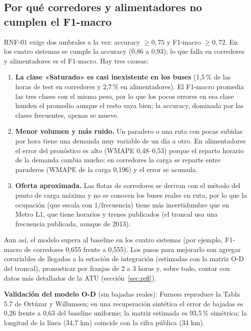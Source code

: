 \documentclass[11pt]{article}
\begin{document}
\subsection{Por qué corredores y alimentadores no cumplen el F1-macro}
\label{sec:f1}
RNF-01 exige dos umbrales a la vez: accuracy $\ge 0{,}75$ y F1-macro $\ge 0{,}72$. En los cuatro sistemas se
cumple la accuracy (0,86 a 0,93); lo que falla en corredores y alimentadores es el F1-macro. Hay tres causas:
\begin{enumerate}
  \item \textbf{La clase «Saturado» es casi inexistente en los buses} (1,5\,\% de las horas de test en corredores y
        2,7\,\% en alimentadores). El F1-macro promedia las tres clases con el mismo peso, por lo que los pocos
        errores en esa clase hunden el promedio aunque el resto vaya bien; la accuracy, dominada por las
        clases frecuentes, apenas se mueve.
  \item \textbf{Menor volumen y más ruido.} Un paradero o una ruta con pocas subidas por hora tiene una demanda
        muy variable de un día a otro. En alimentadores el error del pronóstico es alto (WMAPE 0,48--0,53) porque
        el reparto horario de la demanda cambia mucho; en corredores la carga se reparte entre paraderos
        (WMAPE de la carga 0,196) y el error se acumula.
  \item \textbf{Oferta aproximada.} Las flotas de corredores se derivan con el método del punto de carga máxima y no se
        conocen los buses reales en ruta, por lo que la ocupación (que escala con $1/\text{frecuencia}$) tiene más
        incertidumbre que en Metro L1, que tiene horarios y trenes publicados (el troncal usa una frecuencia publicada, aunque de 2013).
\end{enumerate}
Aun así, el modelo supera al baseline en los cuatro sistemas (por ejemplo, F1-macro de corredores 0,655 frente a
0,555). Los pasos para mejorarlo son agregar covariables de llegadas a la estación de integración (estimadas con
la matriz O-D del troncal), pronosticar por franjas de 2 a 3 horas y, sobre todo, contar con datos más
detallados de la ATU (sección~\ref{sec:refl}).

\textbf{Validación del modelo O-D} (sin bajadas reales): Furness reproduce la Tabla 5.7 de Ortúzar y
Willumsen; en una recuperación sintética el error de bajadas es 0,26 frente a 0,63 del baseline
uniforme; la matriz estimada es 93,5\,\% simétrica; la longitud de la línea (34,7 km) coincide con la
cifra pública (34 km).
\end{document}
